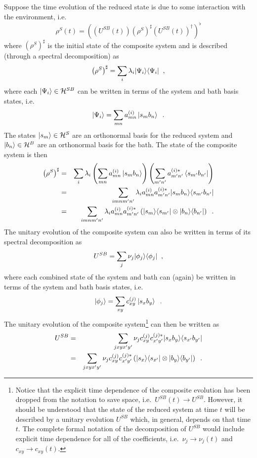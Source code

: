 Suppose the time evolution of the reduced state is due to some interaction with the environment, i.e.\
$$
\rho^S(t) = \left((U^{SB}(t))\left(\rho^{S}\right)^\sharp(U^{SB}(t))^\dagger\right)^\flat 
$$
where $\left(\rho^{S}\right)^\sharp$ is the initial state of the composite system and is described (through a spectral decomposition) as
$$
\left(\rho^{S}\right)^\sharp = \sum_i \lambda_i |\Psi_i\rangle\langle\Psi_i|\;\;,
$$
where each $\left|\Psi_i\right\rangle\in\mathcal{H}^{SB}$ can be written in terms of the system and bath basis states, i.e.\ 
$$
\left|\Psi_i\right\rangle = \sum_{mn} a_{mn}^{(i)} \left|s_m b_n\right\rangle\;\;.
$$
The states $\left|s_m\right\rangle\in\mathcal{H}^S$ are an orthonormal basis for the reduced system and $\left|b_n\right\rangle\in\mathcal{H}^B$ are an orthonormal basis for the bath.  The state of the composite system is then
\begin{eqnarray*}
\left(\rho^{S}\right)^\sharp &=& \sum_i \lambda_i \left(\sum_{mn} a_{mn}^{(i)} \left|s_m b_n\right\rangle\right)\left(\sum_{m^\prime n^\prime} a_{m^\prime n^\prime}^{(i)*} \left\langle s_{m^\prime} b_{n^\prime}\right|\right)\\
&=& \sum_{imnm^\prime n^\prime} \lambda_i a_{mn}^{(i)}a_{m^\prime n^\prime}^{(i)*} |s_m b_n\rangle\langle s_{m^\prime} b_{n^\prime}|\\
&=& \sum_{imnm^\prime n^\prime} \lambda_i a_{mn}^{(i)}a_{m^\prime n^\prime}^{(i)*} \left(|s_m\rangle\langle s_{m^\prime}| \otimes |b_n\rangle\langle b_{n^\prime}|\right)\;\;.
\end{eqnarray*}
The unitary evolution of the composite system can also be written in terms of its spectral decomposition as
$$
U^{SB} = \sum_j \nu_j |\phi_j\rangle\langle\phi_j|\;\;,
$$
where each combined state of the system and bath can (again) be written in terms of the system and bath basis states, i.e.
$$
\left|\phi_j\right\rangle = \sum_{xy} c_{xy}^{(j)} \left|s_x b_y\right\rangle\;\;.
$$
The unitary evolution of the composite system\footnote{Notice that the explicit time dependence of the composite evolution has been dropped from the notation to save space, i.e.\ $U^{SB}(t) \rightarrow U^{SB}$.  However, it should be understood that the state of the reduced system at time $t$ will be described by a unitary evolution $U^{SB}$ which, in general, depends on that time $t$.  The complete formal notation of the decomposition of $U^{SB}$ would include explicit time dependence for all of the coefficients, i.e.\ $\nu_j \rightarrow \nu_j(t)$ and $c_{xy} \rightarrow c_{xy}(t)$.} can then be written as
\begin{eqnarray*}
U^{SB} &=& \sum_{jxyx^\prime y^\prime} \nu_j c_{xy}^{(j)}c_{x^\prime y^\prime}^{(j)*} |s_x b_y\rangle\langle s_{x^\prime} b_{y^\prime}|\\
&=& \sum_{jxyx^\prime y^\prime} \nu_j c_{xy}^{(j)}c_{x^\prime y^\prime}^{(j)*}\left( |s_x\rangle\langle s_{x^\prime}| \otimes |b_y\rangle\langle b_{y^\prime}|\right)\;\;.
\end{eqnarray*}
